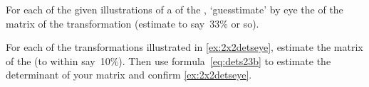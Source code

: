 \begin{exercise} \label{ex:2x2detseye} 
For each of the given illustrations of a  of the , `guesstimate' by eye the  of the matrix of the transformation (estimate to say~33\% or so).
\begin{parts}
\item {}

\item {}

\item {}

\item {}

\item {}

\item {}


\item {}

\item {}

\item {}

\item {}

\item {}

\item {}

\end{parts}
\end{exercise}




\begin{exercise} \label{ex:} 
For each of the transformations illustrated in \autoref{ex:2x2detseye}, estimate the matrix of the  (to within say~10\%). 
Then use formula~\eqref{eq:dets23b} to estimate the determinant of your matrix and confirm \autoref{ex:2x2detseye}.
\end{exercise}





